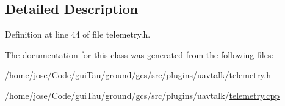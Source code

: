 \subsection{Detailed Description}


Definition at line 44 of file telemetry.\-h.



The documentation for this class was generated from the following files\-:\begin{DoxyCompactItemize}
\item 
/home/jose/\-Code/gui\-Tau/ground/gcs/src/plugins/uavtalk/\hyperlink{telemetry_8h}{telemetry.\-h}\item 
/home/jose/\-Code/gui\-Tau/ground/gcs/src/plugins/uavtalk/\hyperlink{telemetry_8cpp}{telemetry.\-cpp}\end{DoxyCompactItemize}

